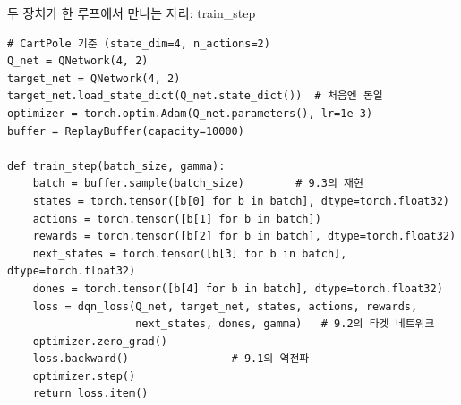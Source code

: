 \begin{frame}[fragile]{두 장치가 한 루프에서 만나는 자리: train\_step}
\begin{lstlisting}
# CartPole 기준 (state_dim=4, n_actions=2)
Q_net = QNetwork(4, 2)
target_net = QNetwork(4, 2)
target_net.load_state_dict(Q_net.state_dict())  # 처음엔 동일
optimizer = torch.optim.Adam(Q_net.parameters(), lr=1e-3)
buffer = ReplayBuffer(capacity=10000)

def train_step(batch_size, gamma):
    batch = buffer.sample(batch_size)        # 9.3의 재현
    states = torch.tensor([b[0] for b in batch], dtype=torch.float32)
    actions = torch.tensor([b[1] for b in batch])
    rewards = torch.tensor([b[2] for b in batch], dtype=torch.float32)
    next_states = torch.tensor([b[3] for b in batch], dtype=torch.float32)
    dones = torch.tensor([b[4] for b in batch], dtype=torch.float32)
    loss = dqn_loss(Q_net, target_net, states, actions, rewards,
                    next_states, dones, gamma)   # 9.2의 타겟 네트워크
    optimizer.zero_grad()
    loss.backward()                # 9.1의 역전파
    optimizer.step()
    return loss.item()
\end{lstlisting}
\end{frame}

